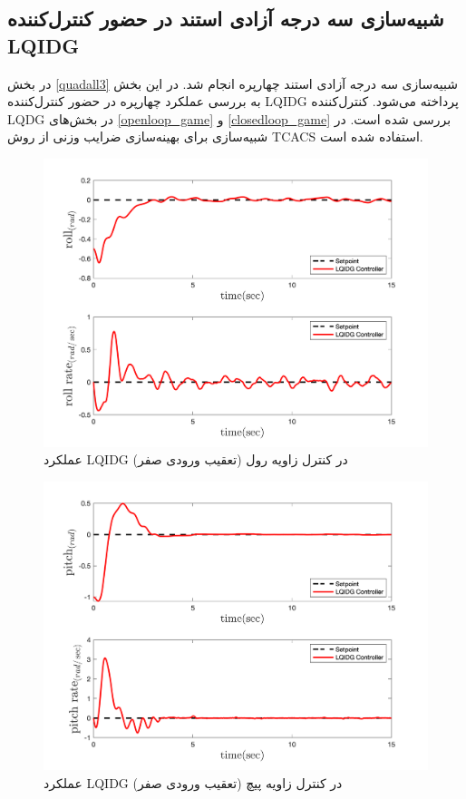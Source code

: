 \subsection{شبیه‌سازی سه درجه آزادی استند در حضور کنترل‌کننده LQIDG}\label{roll_pitch_yaw_lqidg_section}
در بخش
\ref{quadall3}
شبیه‌سازی سه درجه آزادی استند چهارپره انجام شد. در این بخش به بررسی عملکرد چهارپره در حضور کنترل‌کننده LQIDG پرداخته می‌شود. کنترل‌کننده LQDG در بخش‌های
\ref{openloop_game}
و
\ref{closedloop_game}
بررسی شده است.
 در شبیه‌سازی برای بهینه‌سازی ضرایب وزنی از روش
TCACS \cite{Karimi2010}
استفاده شده است.
\begin{figure}[H]
	\includegraphics[width=12cm]{../Figures/MIL/LQIDG/3DOF/lqidg_roll.png}
	\centering
	\caption{عملكرد LQIDG در کنترل زاويه رول (تعقیب ورودی صفر)}
\end{figure}

\begin{figure}[H] 
	\includegraphics[width=12cm]{../Figures/MIL/LQIDG/3DOF/lqidg_pitch.png}
	\centering
	\caption{عملكرد LQIDG در کنترل زاويه پیچ (تعقیب ورودی صفر)}
\end{figure}

